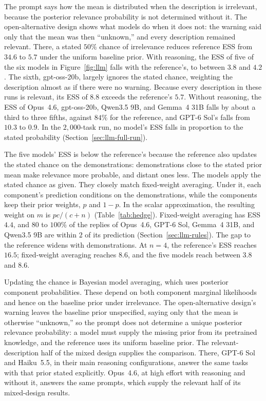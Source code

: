 The prompt says how the mean is distributed when the description is irrelevant, because the posterior relevance probability is not determined without it. The open-alternative design shows what models do when it does not: the warning said only that the mean was then ``unknown,'' and every description remained relevant. There, a stated $50\%$ chance of irrelevance reduces reference ESS from $34.6$ to $5.7$ under the uniform baseline prior. With reasoning, the ESS of five of the six models in Figure~\ref{fig:llm} falls with the reference's, to between $3.8$ and $4.2$. The sixth, gpt-oss-20b, largely ignores the stated chance, weighting the description almost as if there were no warning. Because every description in these runs is relevant, its ESS of $8.8$ exceeds the reference's $5.7$. Without reasoning, the ESS of Opus~4.6, gpt-oss-20b, Qwen3.5 9B, and Gemma~4 31B falls by about a third to three fifths, against $84\%$ for the reference, and GPT-6 Sol's falls from $10.3$ to $0.9$. In the $2{,}000$-task run, no model's ESS falls in proportion to the stated probability (Section~\ref{sec:llm-full-run}).

The five models' ESS is below the reference's because the reference also updates the stated chance on the demonstrations: demonstrations close to the stated prior mean make relevance more probable, and distant ones less. The models apply the stated chance as given. They closely match fixed-weight averaging. Under it, each component's prediction conditions on the demonstrations, while the components keep their prior weights, $p$ and $1-p$. In the scalar approximation, the resulting weight on $m$ is $pc/(c+n)$ (Table~\ref{tab:hedge}). Fixed-weight averaging has ESS $4.4$, and $80$ to $100\%$ of the replies of Opus~4.6, GPT-6 Sol, Gemma~4 31B, and Qwen3.5 9B are within $2$ of its prediction (Section~\ref{sec:llm-rules}). The gap to the reference widens with demonstrations. At $n=4$, the reference's ESS reaches $16.5$; fixed-weight averaging reaches $8.6$, and the five models reach between $3.8$ and $8.6$.

Updating the chance is Bayesian model averaging, which uses posterior component probabilities. These depend on both component marginal likelihoods and hence on the baseline prior under irrelevance. The open-alternative design's warning leaves the baseline prior unspecified, saying only that the mean is otherwise ``unknown,'' so the prompt does not determine a unique posterior relevance probability: a model must supply the missing prior from its pretrained knowledge, and the reference uses its uniform baseline prior. The relevant-description half of the mixed design supplies the comparison. There, GPT-6 Sol and Haiku~5.5, in their main reasoning configurations, answer the same tasks with that prior stated explicitly. Opus~4.6, at high effort with reasoning and without it, answers the same prompts, which supply the relevant half of its mixed-design results.

